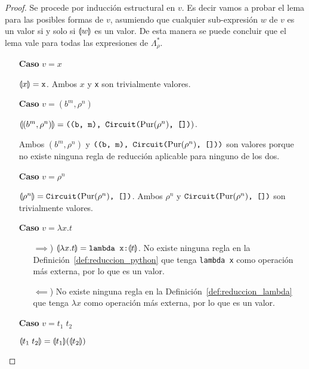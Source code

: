 \begin{proof}

Se procede por inducción estructural en $v$. Es decir vamos a probar el lema para las posibles formas de $v$, asumiendo que cualquier sub-expresión $w$ de $v$ es un valor si y solo si $\llparenthesis w \rrparenthesis$ es un valor. De esta manera se puede concluir que el lema vale para todas las expresiones de $\Lambda_\rho^*$.

\begin{itemize}
     \item[\textbf{Caso}] $v=x$
     
$\llparenthesis x \rrparenthesis = \texttt{x}$. Ambos $x$ y \texttt{x} son trivialmente valores.

     
     \item[\textbf{Caso}] $v=(b^m, \rho^n)$
     
$\llparenthesis (b^m, \rho^n) \rrparenthesis = \texttt{((b, m), Circuit(}\text{Pur}(\rho^n)\texttt{, [])})$.

Ambos $(b^m, \rho^n)$ y $\texttt{((b, m), Circuit(}\text{Pur}(\rho^n)\texttt{, []))}$ son valores porque no existe ninguna regla de reducción aplicable para ninguno de los dos.
     
     \item[\textbf{Caso}] $v=\rho^n$
     
$\llparenthesis \rho^n \rrparenthesis = \texttt{Circuit(}\text{Pur}(\rho^n)\texttt{, [])}$. Ambos $\rho^n$ y $\texttt{Circuit(}\text{Pur}(\rho^n)\texttt{, [])}$ son trivialmente valores.

     \item[\textbf{Caso}] $v=\lambda x.t$
     
\begin{itemize}
    \item[$\implies$)] $\llparenthesis \lambda x.t \rrparenthesis = \texttt{lambda x:}\llparenthesis t \rrparenthesis$.
No existe ninguna regla en la Definición~\ref{def:reduccion_python} que tenga \texttt{lambda x} como operación más externa, por lo que es un valor.
    \item[$\impliedby$)] No existe ninguna regla en la Definición~\ref{def:reduccion_lambda} que tenga $\lambda x$ como operación más externa, por lo que es un valor.
\end{itemize}
     \item[\textbf{Caso}] $v=t_1\;t_2$

$\llparenthesis t_1\;t_2 \rrparenthesis = \llparenthesis t_1 \rrparenthesis(\llparenthesis t_2 \rrparenthesis)$


\end{itemize}
\end{proof}
